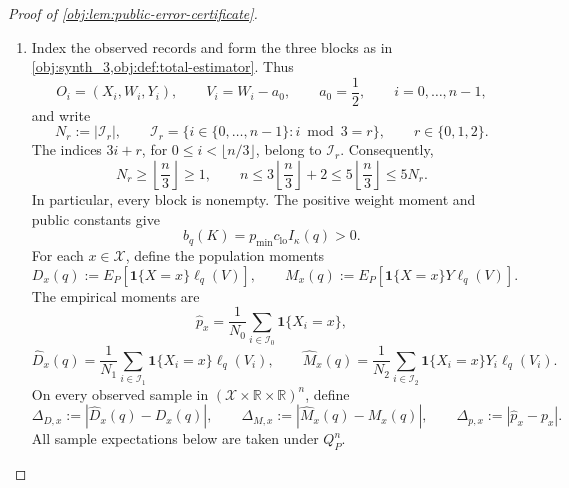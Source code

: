 \begin{proof}[Proof of \cref{obj:lem:public-error-certificate}]
\begin{enumerate}
\item
Index the observed records and form the three blocks as in
\cref{obj:synth_3,obj:def:total-estimator}. Thus
\[
O_i=(X_i,W_i,Y_i),\qquad V_i=W_i-a_0,\qquad a_0=\frac12,
\qquad i=0,\ldots,n-1,
\]
and write
\[
N_r:=|\mathcal I_r|,
\qquad
\mathcal I_r=\{i\in\{0,\ldots,n-1\}:i\bmod3=r\},
\qquad r\in\{0,1,2\}.
\]
The indices \(3i+r\), for \(0\le i<\lfloor n/3\rfloor\), belong to
\(\mathcal I_r\). Consequently,
\[
N_r\ge\left\lfloor\frac n3\right\rfloor\ge1,
\qquad
n\le3\left\lfloor\frac n3\right\rfloor+2
\le5\left\lfloor\frac n3\right\rfloor
\le5N_r.
\]
In particular, every block is nonempty. The positive weight moment and public constants give
\[
b_q(K)=p_{\min}c_{\mathrm{lo}}I_\kappa(q)>0.
\]
For each \(x\in\mathcal X\), define the population moments
\[
D_x(q):=E_P[\mathbf1\{X=x\}\ell_q(V)],
\qquad
M_x(q):=E_P[\mathbf1\{X=x\}Y\ell_q(V)].
\]
The empirical moments are
\[
\widehat p_x=\frac1{N_0}\sum_{i\in\mathcal I_0}\mathbf1\{X_i=x\},
\]
\[
\widehat D_x(q)=\frac1{N_1}\sum_{i\in\mathcal I_1}
\mathbf1\{X_i=x\}\ell_q(V_i),
\qquad
\widehat M_x(q)=\frac1{N_2}\sum_{i\in\mathcal I_2}
\mathbf1\{X_i=x\}Y_i\ell_q(V_i).
\]
On every observed sample in \((\mathcal X\times\mathbb R\times\mathbb R)^n\), define
\[
\Delta_{D,x}:=|\widehat D_x(q)-D_x(q)|,\qquad
\Delta_{M,x}:=|\widehat M_x(q)-M_x(q)|,\qquad
\Delta_{p,x}:=|\widehat p_x-p_x|.
\]
All sample expectations below are taken under \(Q_P^n\).


\end{enumerate}
\end{proof}
